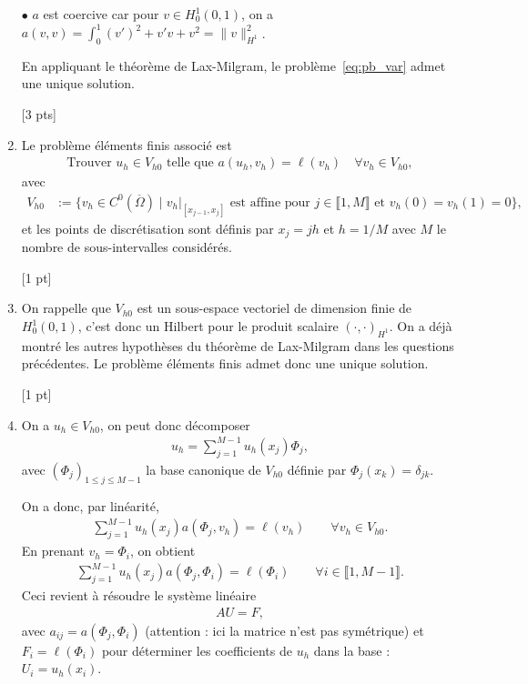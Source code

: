 \documentclass[12pt]{article}
\begin{document}
\begin{cor}
\begin{enumerate}
    $\bullet$ $a$ est coercive car
    pour $v \in H^1_0(0,1)$, on a $a(v,v) = \int_0^1 (v')^2 + v'v + v^2 = \| v \|_{H^1}^2$.
    

    En appliquant le th\'eor\`eme de Lax-Milgram, le probl\`eme~\eqref{eq:pb_var}
    admet une unique solution.
    
    [3 pts]

  \item Le probl\`eme \'el\'ements finis associ\'e est
    \begin{align*}
      \text{Trouver } u_h \in V_{h0} \text{ telle que }
      a(u_h , v_h) = \ell(v_h) \quad \forall v_h \in V_{h0} ,
    \end{align*}
    avec
    \begin{align*}
      V_{h0}
      &:= \{ v_h \in C^0(\overline{\Omega}) \; | \; v_h \vert_{[x_{j-1} , x_{j}]} \text{ est affine pour }
         j \in \llbracket 1,M \rrbracket
        \text{ et } v_h(0) = v_h(1) = 0 \} ,
    \end{align*}
    et les points de discr\'etisation sont d\'efinis par $x_j = jh$ et $h = 1/M$
    avec $M$ le nombre de sous-intervalles consid\'er\'es.

    [1 pt]
    
  \item On rappelle que $V_{h0}$ est un sous-espace vectoriel de dimension finie de $H_0^1(0,1)$,
    c'est donc un Hilbert pour le produit scalaire $(\cdot,\cdot)_{H^1}$.
    On a d\'ej\`a montr\'e les autres hypoth\`eses du th\'eor\`eme de Lax-Milgram
    dans les questions pr\'ec\'edentes.
    Le probl\`eme \'el\'ements finis admet donc une unique solution.

    [1 pt]

  \item On a $u_h \in V_{h0}$, on peut donc d\'ecomposer
    \begin{align*}
      u_h = \sum_{j=1}^{M-1} u_h(x_j) \Phi_j ,
    \end{align*}
    avec $(\Phi_j)_{1 \leq j \leq M-1}$ la base canonique de $V_{h0}$ d\'efinie par
    $\Phi_j(x_k) = \delta_{jk}$.

    On a donc, par lin\'earit\'e,
    \begin{align*}
      \sum_{j=1}^{M-1} u_h(x_j) a(\Phi_j , v_h) = \ell(v_h) \qquad \forall v_h \in V_{h0} .
    \end{align*}
    En prenant $v_h = \Phi_i$, on obtient
    \begin{align*}
      \sum_{j=1}^{M-1} u_h(x_j) a(\Phi_j , \Phi_i) = \ell(\Phi_i) \qquad \forall i \in \llbracket 1 , M-1 \rrbracket .
    \end{align*}
    Ceci revient \`a r\'esoudre le syst\`eme lin\'eaire
    \begin{align*}
      A U = F ,
    \end{align*}
    avec $a_{ij} = a(\Phi_j , \Phi_i)$ (attention : ici la matrice n'est pas sym\'etrique)
    et $F_i = \ell(\Phi_i)$ pour d\'eterminer les coefficients de $u_h$ dans la base :
    $U_i = u_h(x_i)$.


\end{enumerate}
\end{cor}
\end{document}
